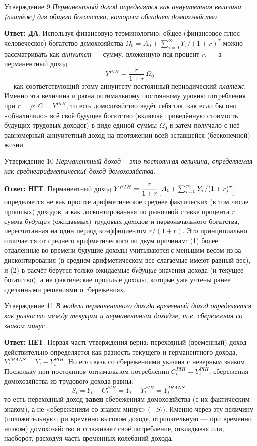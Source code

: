 \documentclass[10pt,a4paper]{article}
\newcommand{\qda}{\textbf{\color{yesgreen}Ответ: ДА}}
\newcommand{\qnet}{\textbf{\color{nored}Ответ: НЕТ}}
\newenvironment{answer}[2]{%
  \begin{qbox}{Утверждение #1}
  \textit{#2}\par\smallskip
}{%
  \end{qbox}\vspace{2pt}
}
\begin{document}
\begin{answer}{9}{Перманентный доход определятся как аннуитетная величина (платёж) для общего богатства, которым обладает домохозяйство.}
\qda. Используя финансовую терминологию: общее (финансовое плюс человеческое) богатство домохозяйства $\Omega_0=A_0+\sum_{\tau=0}^{\infty}Y_\tau/(1+r)^\tau$ можно рассматривать как \emph{аннуитет} — сумму, вложенную под процент $r$, — а перманентный доход
\[
Y^{PIH}=\frac{r}{1+r}\,\Omega_0
\]
— как соответствующий этому аннуитету постоянный периодический \emph{платёж}. Именно эта величина и равна оптимальному постоянному уровню потребления при $r=\rho$: $C=Y^{PIH}$, то есть домохозяйство ведёт себя так, как если бы оно «обналичило» всё своё будущее богатство (включая приведённую стоимость будущих трудовых доходов) в виде единой суммы $\Omega_0$ и затем получало с неё равномерный аннуитетный доход на протяжении всей оставшейся (бесконечной) жизни.
\end{answer}
 
\begin{answer}{10}{Перманентный доход – это постоянная величина, определяемая как среднеарифметический доход домохозяйства.}
\qnet. Перманентный доход $Y^{PIH}=\dfrac{r}{1+r}\Bigl[A_0+\sum_{\tau=0}^{\infty}Y_\tau/(1+r)^\tau\Bigr]$ определяется не как простое арифметическое среднее фактических (в том числе прошлых) доходов, а как дисконтированная по рыночной ставке процента $r$ сумма \emph{будущих} (ожидаемых) трудовых доходов и первоначального богатства, пересчитанная на один период коэффициентом $r/(1+r)$. Это принципиально отличается от среднего арифметического по двум причинам: (1) более отдалённые во времени будущие доходы учитываются с меньшим весом из-за дисконтирования (в среднем арифметическом все слагаемые имеют равный вес), и (2) в расчёт берутся только ожидаемые \emph{будущие} значения дохода (и текущее богатство), а не фактические прошлые доходы, которые уже учтены ранее сделанными решениями о сбережениях.
\end{answer}
 
\begin{answer}{11}{В модели перманентного дохода временный доход определяется как разность между текущим и перманентным доходом, т.е. сбережения со знаком минус.}
\qnet. Первая часть утверждения верна: переходный (временный) доход действительно определяется как разность текущего и перманентного дохода, $Y^{TRANS}_t=Y_t-Y^{PIH}_t$. Но его связь со сбережениями указана с неверным знаком. Поскольку при постоянном оптимальном потреблении $C_t^{PIH}=Y^{PIH}_t$, сбережения домохозяйства из трудового дохода равны:
\[
S_t = Y_t - C_t^{PIH} = Y_t - Y^{PIH}_t = Y^{TRANS}_t,
\]
то есть переходный доход \textbf{равен} сбережениям домохозяйства (с их фактическим знаком), а не «сбережениям со знаком минус» ($-S_t$). Именно через эту величину (положительную при временно высоком доходе, отрицательную — при временно низком) домохозяйство и сглаживает своё потребление, откладывая или, наоборот, расходуя часть временных колебаний дохода.
\end{answer}
 
\end{document}
